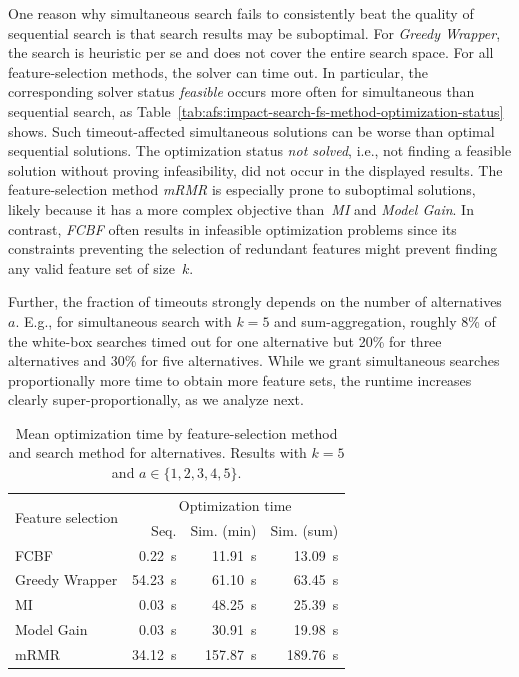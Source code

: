 \documentclass[iicol, sn-basic, Numbered]{sn-jnl} %
\theoremstyle{plain}
\theoremstyle{definition}
\begin{document}
One reason why simultaneous search fails to consistently beat the quality of sequential search is that search results may be suboptimal.
For \emph{Greedy Wrapper}, the search is heuristic per se and does not cover the entire search space.
For all feature-selection methods, the solver can time out.
In particular, the corresponding solver status \emph{feasible} occurs more often for simultaneous than sequential search, as Table~\ref{tab:afs:impact-search-fs-method-optimization-status} shows.
Such timeout-affected simultaneous solutions can be worse than optimal sequential solutions.
The optimization status \emph{not solved}, i.e., not finding a feasible solution without proving infeasibility, did not occur in the displayed results.
The feature-selection method \emph{mRMR} is especially prone to suboptimal solutions, likely because it has a more complex objective than~\emph{MI} and \emph{Model Gain}.
In contrast, \emph{FCBF} often results in infeasible optimization problems since its constraints preventing the selection of redundant features might prevent finding any valid feature set of size~$k$.

Further, the fraction of timeouts strongly depends on the number of alternatives~$a$.
E.g., for simultaneous search with $k=5$ and sum-aggregation, roughly 8\% of the white-box searches timed out for one alternative but 20\% for three alternatives and 30\% for five alternatives.
While we grant simultaneous searches proportionally more time to obtain more feature sets, the runtime increases clearly super-proportionally, as we analyze next.

\begin{table}[t]
	\centering
	\caption{
		Mean optimization time by feature-selection method and search method for alternatives.
		Results with $k=5$ and $a \in \{1,2,3,4,5\}$.
	}
	\begin{tabular}{lrrr}
		\toprule
		\multirow{2}{*}{Feature selection} & \multicolumn{3}{c}{Optimization time} \\
		\cmidrule(r){2-4}
		& Seq. & Sim. (min) & Sim. (sum) \\
		\midrule
		FCBF & 0.22~s & 11.91~s & 13.09~s \\
		Greedy Wrapper & 54.23~s & 61.10~s & 63.45~s \\
		MI & 0.03~s & 48.25~s & 25.39~s \\
		Model Gain & 0.03~s & 30.91~s & 19.98~s \\
		mRMR & 34.12~s & 157.87~s & 189.76~s \\
		\bottomrule
	\end{tabular}
	\label{tab:afs:impact-search-fs-method-optimization-time}
\end{table}
\end{document}
